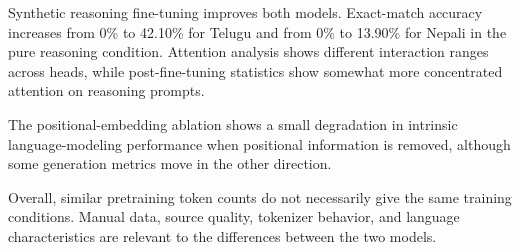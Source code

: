 \documentclass[10pt,a4paper]{article}
\begin{document}
Synthetic reasoning fine-tuning improves both models. Exact-match
accuracy increases from 0\% to 42.10\% for Telugu and from 0\% to
13.90\% for Nepali in the pure reasoning condition. Attention analysis
shows different interaction ranges across heads, while post-fine-tuning
statistics show somewhat more concentrated attention on reasoning
prompts.

The positional-embedding ablation shows a small degradation in
intrinsic language-modeling performance when positional information is
removed, although some generation metrics move in the other direction.

Overall, similar pretraining token counts do not necessarily give the
same training conditions. Manual data, source quality, tokenizer
behavior, and language characteristics are relevant to the differences
between the two models.
\end{document}

